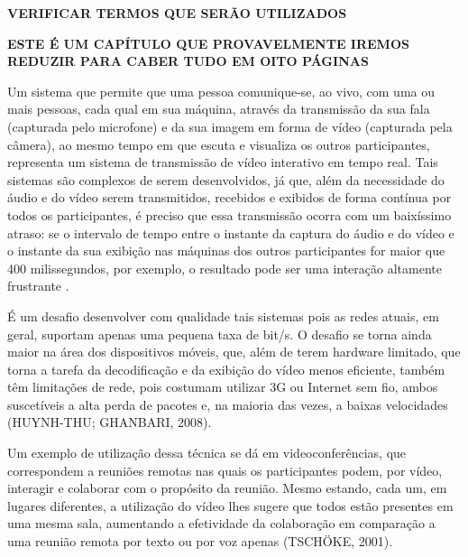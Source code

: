 \documentclass{acm_proc_article-sp}
\newcommand{\todo}[1]{\textcolor[rgb]{1.00,0.00,0.00}{\bf \uppercase{#1}}}
\begin{document}
\todo{verificar termos que serão utilizados}

\todo{este é um capítulo que provavelmente iremos reduzir para caber tudo em oito páginas}

Um sistema que permite que uma pessoa comunique-se, ao vivo, com uma ou mais
pessoas, cada qual em sua máquina, através da transmissão da sua fala (capturada pelo microfone) e da sua imagem em forma de vídeo (capturada pela câmera), ao mesmo tempo em que escuta e visualiza os outros participantes, representa um sistema de transmissão de vídeo interativo em tempo real. Tais sistemas são complexos de serem desenvolvidos, já que, além da necessidade do áudio e do vídeo serem transmitidos, recebidos e exibidos de forma contínua por todos os participantes, é preciso que essa transmissão ocorra com um baixíssimo atraso: se o intervalo de tempo entre o instante da captura do áudio e do vídeo e o instante da sua exibição nas máquinas dos outros participantes for maior que 400 milissegundos, por exemplo, o resultado pode ser uma interação altamente frustrante \cite{kurose_1999}.

É um desafio desenvolver com qualidade tais sistemas pois as redes atuais, em geral, suportam apenas uma pequena taxa de bit/s. O desafio se torna ainda maior na área dos dispositivos móveis, que, além de terem hardware limitado, que torna a tarefa da decodificação e da exibição do vídeo menos eficiente, também têm limitações de rede, pois costumam utilizar 3G ou Internet sem fio, ambos suscetíveis a alta perda de pacotes e, na maioria das vezes, a baixas velocidades (HUYNH-THU; GHANBARI, 2008).

Um exemplo de utilização dessa técnica se dá em videoconferências, que correspondem a reuniões remotas nas quais os participantes podem, por vídeo, interagir e colaborar com o propósito da reunião. Mesmo estando, cada um, em lugares diferentes, a utilização do vídeo lhes sugere que todos estão presentes em uma mesma sala, aumentando a efetividade da colaboração em comparação a uma reunião remota por texto ou por voz apenas (TSCHÖKE, 2001).
\end{document}
